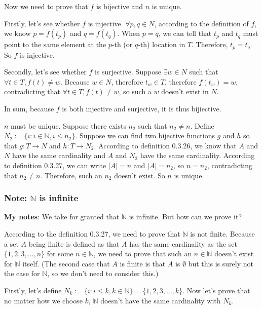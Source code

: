 \documentclass[12pt, letterpaper, oneside]{book}
\begin{document}
Now we need to prove that $f$ is bijective and $n$ is unique.

Firstly, let's see whether $f$ is injective. $\forall p, q \in N$, according to
the definition of $f$, we know $p = f(t_p)$ and $q = f(t_q)$. When $p = q$, we
can tell that $t_p$ and $t_q$ must point to the same element at the $p$-th (or
$q$-th) location in $T$. Therefore, $t_p = t_q$. So $f$ is injective.

Secondly, let's see whether $f$ is surjective. Suppose $\exists w \in N$ such
that $\forall t \in T, f(t) \neq w$. Because $w \in N$, therefore $t_w \in T$,
therefore $f(t_w) = w$, contradicting that $\forall t \in T, f(t) \neq w$, so
such a $w$ doesn't exist in $N$.

In sum, because $f$ is both injective and surjective, it is thus bijiective.

$n$ must be unique. Suppose there exists $n_2$ such that $n_2 \neq n$.
Define $N_2:= \{i: i \in \mathbb{N}, i \leq n_2\}$. Suppose we can find two
bijective functions $g$ and $h$ so that $g: T \rightarrow N$ and $h: T
  \rightarrow N_2$. According to definition 0.3.26, we know that $A$ and $N$ have
the same cardinality and $A$ and $N_2$ have the same cardinality. According to
definition 0.3.27, we can write $|A| = n$ and $|A| = n_2$, so $n = n_2$,
contradicting that $n_2 \neq n$. Therefore, such an $n_2$ doesn't exist. So $n$
is unique.

\subsubsection{Note: $\mathbb{N}$ is infinite}

\colorbox{lime!100}{\textbf{My notes}}: We take for granted that $\mathbb{N}$
is infinite. But how can we prove it?

According to the definition 0.3.27, we need to prove that $\mathbb{N}$ is not
finite. Because a set $A$ being finite is defined as that $A$ has the same
cardinality as the set $\{1, 2, 3, \ldots, n\}$ for some $n \in \mathbb{N}$, we
need to prove that such an $n \in \mathbb{N}$ doesn't exist for $\mathbb{N}$
itself. (The second case that $A$ is finite is that $A$ is $\emptyset$ but this
is surely not the case for $\mathbb{N}$, so we don't need to consider this.)

Firstly, let's define $N_k:= \{i: i \leq k, k \in \mathbb{N}\} = \{1, 2, 3,
  \ldots, k\}$. Now let's prove that no matter how we choose $k$, $\mathbb{N}$
doesn't have the same cardinality with $N_k$.
\end{document}
